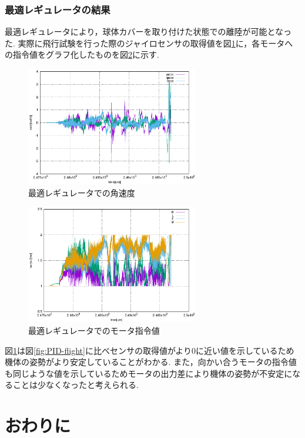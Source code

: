 \documentclass[12pt,oneside]{sotsuken_paper}
\begin{document}
\subsection{最適レギュレータの結果}
最適レギュレータにより，球体カバーを取り付けた状態での離陸が可能となった.
実際に飛行試験を行った際のジャイロセンサの取得値を図\ref{fig:rate}に，各モータへの指令値をグラフ化したものを図\ref{fig:RLFB}に示す.

\begin{figure}[htbp]
	\begin{center}
		\includegraphics[width=75mm]{image/flight-test/regulator-rate.eps}
		\caption{最適レギュレータでの角速度}
		\label{fig:rate}
	\end{center}
\end{figure}

\begin{figure}[htbp]
	\begin{center}
		\includegraphics[width=75mm]{image/flight-test/regulator-RLFB.eps}
		\caption{最適レギュレータでのモータ指令値}
		\label{fig:RLFB}
	\end{center}
\end{figure}

図\ref{fig:rate}は図\ref{fig:PID-flight}に比べセンサの取得値がより0に近い値を示しているため機体の姿勢がより安定していることがわかる.
また，向かい合うモータの指令値も同じような値を示しているためモータの出力差により機体の姿勢が不安定になることは少なくなったと考えられる.


\chapter{おわりに}
\end{document}
